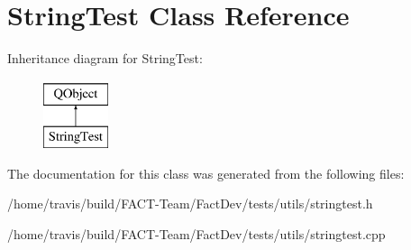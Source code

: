 \hypertarget{classStringTest}{\section{String\-Test Class Reference}
\label{classStringTest}
}
Inheritance diagram for String\-Test\-:\begin{figure}[H]
\begin{center}
\leavevmode
\includegraphics[height=2.000000cm]{d1/d6b/classStringTest}
\end{center}
\end{figure}


The documentation for this class was generated from the following files\-:\begin{DoxyCompactItemize}
\item 
/home/travis/build/\-F\-A\-C\-T-\/\-Team/\-Fact\-Dev/tests/utils/stringtest.\-h\item 
/home/travis/build/\-F\-A\-C\-T-\/\-Team/\-Fact\-Dev/tests/utils/stringtest.\-cpp\end{DoxyCompactItemize}
